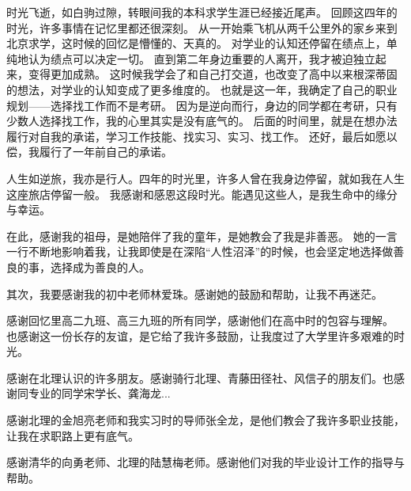 %
%
%
%
%
%

\renewcommand{\thechapter}{致谢}



时光飞逝，如白驹过隙，转眼间我的本科求学生涯已经接近尾声。
回顾这四年的时光，许多事情在记忆里都还很深刻。
从一开始乘飞机从两千公里外的家乡来到北京求学，这时候的回忆是懵懂的、天真的。
对学业的认知还停留在绩点上，单纯地认为绩点可以决定一切。
直到第二年身边重要的人离开，我才被迫独立起来，变得更加成熟。
这时候我学会了和自己打交道，也改变了高中以来根深蒂固的想法，对学业的认知变成了更多维度的。
也就是这一年，我确定了自己的职业规划——选择找工作而不是考研。
因为是逆向而行，身边的同学都在考研，只有少数人选择找工作，我的心里其实是没有底气的。
后面的时间里，就是在想办法履行对自我的承诺，学习工作技能、找实习、实习、找工作。
还好，最后如愿以偿，我履行了一年前自己的承诺。

人生如逆旅，我亦是行人。四年的时光里，许多人曾在我身边停留，就如我在人生这座旅店停留一般。
我感谢和感恩这段时光。能遇见这些人，是我生命中的缘分与幸运。

在此，感谢我的祖母，是她陪伴了我的童年，是她教会了我是非善恶。
她的一言一行不断地影响着我，让我即使是在深陷“人性沼泽”的时候，也会坚定地选择做善良的事，选择成为善良的人。

其次，我要感谢我的初中老师林爱珠。感谢她的鼓励和帮助，让我不再迷茫。

感谢回忆里高二九班、高三九班的所有同学，感谢他们在高中时的包容与理解。
也感谢这一份长存的友谊，是它给了我许多鼓励，让我度过了大学里许多艰难的时光。

感谢在北理认识的许多朋友。感谢骑行北理、青藤田径社、风信子的朋友们。也感谢同专业的同学宋学长、龚海龙...

感谢北理的金旭亮老师和我实习时的导师张全龙，是他们教会了我许多职业技能，让我在求职路上更有底气。

感谢清华的向勇老师、北理的陆慧梅老师。感谢他们对我的毕业设计工作的指导与帮助。



